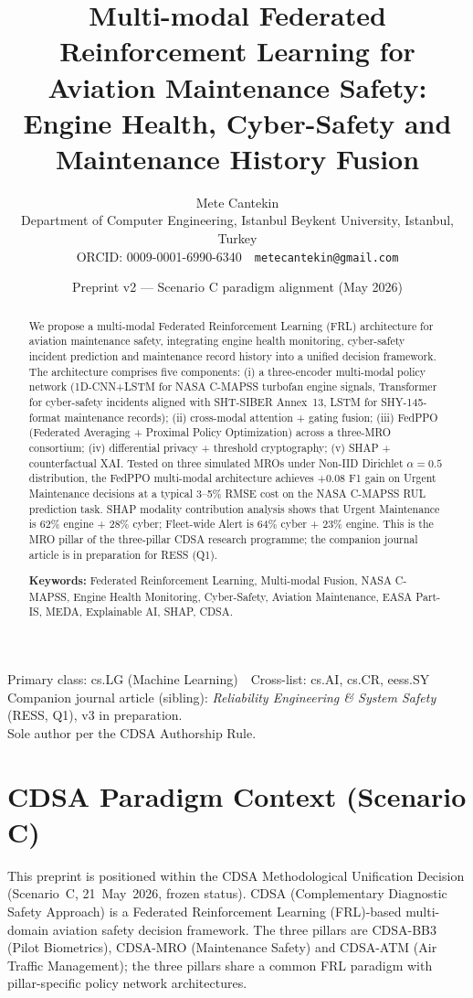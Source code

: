 \documentclass[11pt]{article}
\title{\bfseries Multi-modal Federated Reinforcement Learning for Aviation Maintenance Safety: Engine Health, Cyber-Safety and Maintenance History Fusion}
\author{Mete Cantekin\\[2pt]
\normalsize Department of Computer Engineering, Istanbul Beykent University, Istanbul, Turkey\\
\normalsize ORCID: 0009-0001-6990-6340 \,\textperiodcentered\, \texttt{metecantekin@gmail.com}}
\date{Preprint v2 --- Scenario C paradigm alignment (May 2026)}
\begin{document}
\maketitle

\begin{center}\small
Primary class: cs.LG (Machine Learning) \,\textperiodcentered\, Cross-list: cs.AI, cs.CR, eess.SY\\
Companion journal article (sibling): \emph{Reliability Engineering \& System Safety} (RESS, Q1), v3 in preparation.\\
Sole author per the CDSA Authorship Rule.
\end{center}

\begin{abstract}
\noindent We propose a multi-modal Federated Reinforcement Learning (FRL) architecture for aviation maintenance safety, integrating engine health monitoring, cyber-safety incident prediction and maintenance record history into a unified decision framework. The architecture comprises five components: (i) a three-encoder multi-modal policy network (1D-CNN+LSTM for NASA C-MAPSS turbofan engine signals, Transformer for cyber-safety incidents aligned with SHT-SIBER Annex~13, LSTM for SHY-145-format maintenance records); (ii) cross-modal attention + gating fusion; (iii) FedPPO (Federated Averaging + Proximal Policy Optimization) across a three-MRO consortium; (iv) differential privacy + threshold cryptography; (v) SHAP + counterfactual XAI. Tested on three simulated MROs under Non-IID Dirichlet $\alpha=0.5$ distribution, the FedPPO multi-modal architecture achieves $+0.08$ F1 gain on Urgent Maintenance decisions at a typical 3--5\% RMSE cost on the NASA C-MAPSS RUL prediction task. SHAP modality contribution analysis shows that Urgent Maintenance is 62\% engine + 28\% cyber; Fleet-wide Alert is 64\% cyber + 23\% engine. This is the MRO pillar of the three-pillar CDSA research programme; the companion journal article is in preparation for RESS (Q1).

\medskip
\noindent\textbf{Keywords:} Federated Reinforcement Learning, Multi-modal Fusion, NASA C-MAPSS, Engine Health Monitoring, Cyber-Safety, Aviation Maintenance, EASA Part-IS, MEDA, Explainable AI, SHAP, CDSA.
\end{abstract}

\section*{CDSA Paradigm Context (Scenario C)}
This preprint is positioned within the CDSA Methodological Unification Decision (Scenario~C, 21~May~2026, frozen status). CDSA (Complementary Diagnostic Safety Approach) is a Federated Reinforcement Learning (FRL)-based multi-domain aviation safety decision framework. The three pillars are CDSA-BB3 (Pilot Biometrics), CDSA-MRO (Maintenance Safety) and CDSA-ATM (Air Traffic Management); the three pillars share a common FRL paradigm with pillar-specific policy network architectures.
\end{document}
